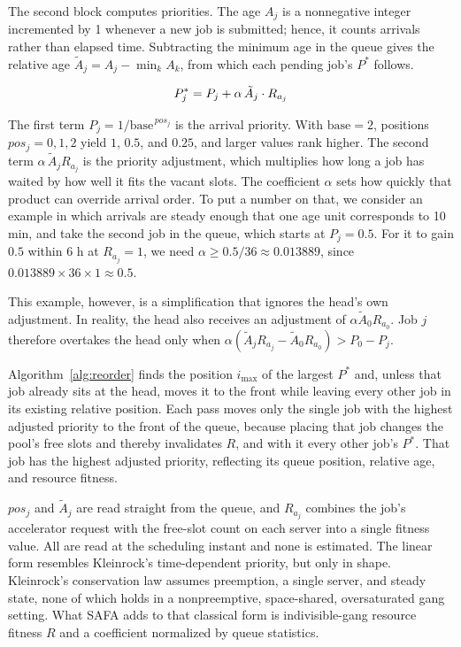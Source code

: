 \documentclass{ieeetj}
\begin{document}
The second block computes priorities. The age $A_j$ is a nonnegative integer incremented by 1 whenever a new job is submitted; hence, it counts arrivals rather than elapsed time. Subtracting the minimum age in the queue gives the relative age $\tilde A_j=A_j-\min_k A_k$, from which each pending job's $P^*$ follows.

\begin{equation}
P^*_j = P_j + \alpha\, \tilde A_j \cdot R_{a_j}
\label{eq:01}
\vspace{2pt}
\end{equation}

The first term $P_j=1/\text{base}^{\,pos_j}$ is the arrival priority. With $\text{base}=2$, positions $pos_j=0,1,2$ yield $1$, $0.5$, and $0.25$, and larger values rank higher. The second term $\alpha\,\tilde A_j R_{a_j}$ is the priority adjustment, which multiplies how long a job has waited by how well it fits the vacant slots. The coefficient $\alpha$ sets how quickly that product can override arrival order. To put a number on that, we consider an example in which arrivals are steady enough that one age unit corresponds to 10 min, and take the second job in the queue, which starts at $P_j=0.5$. For it to gain $0.5$ within 6 h at $R_{a_j}=1$, we need $\alpha\ge0.5/36\approx0.013889$, since $0.013889\times36\times1\approx0.5$.

This example, however, is a simplification that ignores the head's own adjustment. In reality, the head also receives an adjustment of $\alpha\tilde A_0R_{a_0}$. Job $j$ therefore overtakes the head only when $\alpha(\tilde A_jR_{a_j}-\tilde A_0R_{a_0})>P_0-P_j$.

Algorithm~\ref{alg:reorder} finds the position $i_{\max}$ of the largest $P^*$ and, unless that job already sits at the head, moves it to the front while leaving every other job in its existing relative position. Each pass moves only the single job with the highest adjusted priority to the front of the queue, because placing that job changes the pool's free slots and thereby invalidates $R$, and with it every other job's $P^*$. That job has the highest adjusted priority, reflecting its queue position, relative age, and resource fitness.

$pos_j$ and $\tilde A_j$ are read straight from the queue, and $R_{a_j}$ combines the job's accelerator request with the free-slot count on each server into a single fitness value. All are read at the scheduling instant and none is estimated. The linear form resembles Kleinrock's time-dependent priority\cite{kleinrock1976queueing}, but only in shape. Kleinrock's conservation law assumes preemption, a single server, and steady state, none of which holds in a nonpreemptive, space-shared, oversaturated gang setting. What SAFA adds to that classical form is indivisible-gang resource fitness $R$ and a coefficient normalized by queue statistics.
\end{document}

